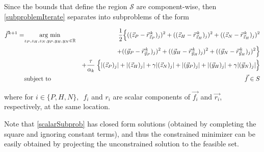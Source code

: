 Since the bounds that define the region $\mathcal{S}$ are component-wise, then  \ref{subproblemIterate} separates into subproblems of the form

\renewcommand{\arraystretch}{1}
\begin{equation} \label{scalarSubprob}
	\begin{aligned}
		\vec{f}^{k+1} = & \underset{ z_P,z_H,z_N,y_P,y_H,y_N \in \mathbb{R}}{\text{arg min}}
		&  \frac{1}{2} \Big\{
		((\vec{z}_P - \vec{r}_{\vec{z}_P}^{\, k})_j)^2 + 
		((\vec{z}_H - \vec{r}_{\vec{z}_H}^{\, k})_j)^2 +
		((\vec{z}_N - \vec{r}_{\vec{z}_H}^{\, k})_j)^2 \\ & & + 
		((\vec{y}_P - \vec{r}_{\vec{y}_P}^{\, k})_j)^2 + 
		((\vec{y}_H - \vec{r}_{\vec{y}_H}^{\, k})_j)^2 +
		((\vec{y}_N - \vec{r}_{\vec{y}_H}^{\, k})_j)^2 \Big\} \\ & & +
		\frac{\tau}{\alpha_k} \; \Big\{ 
		|(\vec{z}_P)_j| + |(\vec{z}_H)_j| + \gamma |(\vec{z}_N)_j|  +
		|(\vec{y}_P)_j| + |(\vec{y}_H)_j| + \gamma |(\vec{y}_N)_j|\Big\} \\
		& \text{subject to} &  \vec{f} \in S
	\end{aligned}
\end{equation}

where for $i \in \{P,H,N\},\,$ $f_i$ and $r_i$  are scalar components of $\vec{f_i}$ and $\vec{r_i}$, respectively, at the same location.  

Note that \ref{scalarSubprob} has closed form solutions (obtained by completing the square and ignoring constant terms), and thus the constrained minimizer can be easily obtained by projecting the unconstrained solution to the feasible set. 


